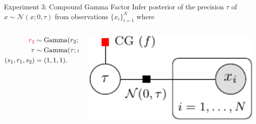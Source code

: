 \documentclass[english]{beamer}
\begin{document}
\begin{frame}
\begin{columns}[t]
\begin{block}{ Experiment 3: Compound Gamma Factor }
Infer posterior of the precision $\tau$ of $x \sim \mathcal{N}(x; 0, \tau)$ 
from observations $\{x_i\}_{i=1}^N $ where 
%
\noindent
\begin{columns}[T]
   \hspace{-5cm}
   \begin{column}{1cm}
       \begin{align*}
          \textcolor{magenta}{r_2} &\sim \mathrm{Gamma}(r_2; s_1, r_1)  \\
          \tau &\sim \mathrm{Gamma}(\tau; s_2, \textcolor{magenta}{r_2} ) \\
          (s_1, r_1, s_2) &= (1, 1, 1).
       \end{align*}
   \end{column}
   \hspace{-10cm}
   \begin{column}{1cm}
   \includegraphics[width=11cm]{img/compound_gamma_graph-crop}
   \end{column}
\end{columns}


\end{block}
\end{columns}
\end{frame}
\end{document}
